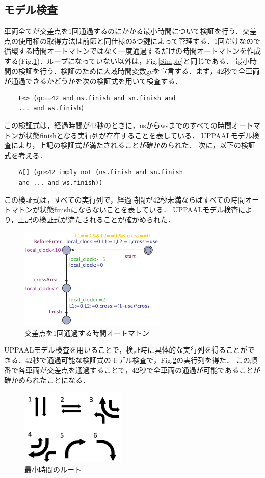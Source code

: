 \documentclass{jarticle}
\begin{document}
\subsection{モデル検査}
車両全てが交差点を1回通過するのにかかる最小時間について検証を行う．交差点の使用権の取得方法は前節と同仕様の5つ鍵によって管理する．1回だけなので循環する時間オートマトンではなく一度通過するだけの時間オートマトンを作成する(Fig.\ref{minT})．ループになっていない以外は，Fig.\ref{Simple}と同じである．
最小時間の検証を行う．検証のために大域時間変数gcを宣言する．まず，42秒で全車両が通過できるかどうかを次の検証式を用いて検査する．
	
	\begin{verbatim}
	E<> (gc==42 and ns.finish and sn.finish and 
	... and ws.finish)	
	\end{verbatim}
この検証式は，経過時間が42秒のときに，nsからwsまでのすべての時間オートマトンが状態finishとなる実行列が存在することを表している．
UPPAALモデル検査により，上記の検証式が満たされることが確かめられた．
次に，以下の検証式を考える．
	\begin{verbatim}
	A[] (gc<42 imply not (ns.finish and sn.finish  
	and ... and ws.finish))
	\end{verbatim}
この検証式は，すべての実行列で，経過時間が42秒未満ならばすべての時間オートマトンが状態finishにならないことを表している．
UPPAALモデル検査により，上記の検証式が満たされることが確かめられた．
	\begin{figure}[htbp]
	\centering
	\includegraphics[width=70mm]{minTime.png}
	\caption{交差点を1回通過する時間オートマトン}
	\label{minT}
	\end{figure}
UPPAALモデル検査を用いることで，検証時に具体的な実行列を得ることができる．42秒で通過可能な検証式のモデル検査で，Fig.\ref{veriT}の実行列を得た．
この順番で各車両が交差点を通過することで，42秒で全車両の通過が可能であることが確かめられたことになる．
	
	\begin{figure}[htbp]
	\centering
	\includegraphics[width=50mm]{veriT.png}
	\caption{最小時間のルート}
	\label{veriT}
	\end{figure}
\end{document}
